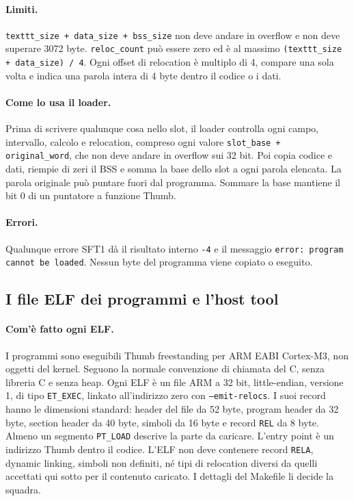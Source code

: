 \paragraph{Limiti.} \texttt{texttt\_size + data\_size + bss\_size} non deve andare in overflow e non deve superare 3072 byte. \texttt{reloc\_count} può essere zero ed è al massimo \texttt{(texttt\_size + data\_size) / 4}. Ogni offset di relocation è multiplo di 4, compare una sola volta e indica una parola intera di 4 byte dentro il codice o i dati.

\paragraph{Come lo usa il loader.} Prima di scrivere qualunque cosa nello slot, il loader controlla ogni campo, intervallo, calcolo e relocation, compreso ogni valore \texttt{slot\_base + original\_word}, che non deve andare in overflow sui 32 bit. Poi copia codice e dati, riempie di zeri il BSS e somma la base dello slot a ogni parola elencata. La parola originale può puntare fuori dal programma. Sommare la base mantiene il bit 0 di un puntatore a funzione Thumb.

\paragraph{Errori.} Qualunque errore SFT1 dà il risultato interno \texttt{-4} e il messaggio \texttt{error:\ program cannot be loaded}. Nessun byte del programma viene copiato o eseguito.

\subsection{I file ELF dei programmi e l'host tool}

\paragraph{Com'è fatto ogni ELF.} I programmi sono eseguibili Thumb freestanding per ARM EABI Cortex-M3, non oggetti del kernel. Seguono la normale convenzione di chiamata del C, senza libreria C e senza heap. Ogni ELF è un file ARM a 32 bit, little-endian, versione 1, di tipo \texttt{ET\_EXEC}, linkato all'indirizzo zero con \texttt{--emit-relocs}. I suoi record hanno le dimensioni standard: header del file da 52 byte, program header da 32 byte, section header da 40 byte, simboli da 16 byte e record \texttt{REL} da 8 byte. Almeno un segmento \texttt{PT\_LOAD} descrive la parte da caricare. L'entry point è un indirizzo Thumb dentro il codice. L'ELF non deve contenere record \texttt{RELA}, dynamic linking, simboli non definiti, né tipi di relocation diversi da quelli accettati qui sotto per il contenuto caricato. I dettagli del Makefile li decide la squadra.

